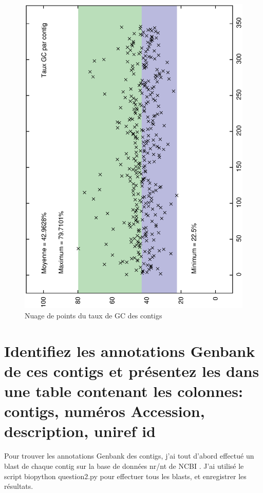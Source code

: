 \documentclass[10.9pt]{article} %
\begin{document}
\begin{figure}[p]
\includegraphics[scale=0.6,angle=270]{question_1/contigs_taux.eps}
\caption{Nuage de points du taux de GC des contigs}
\end{figure}


\newpage
\section{Identifiez les annotations Genbank de ces contigs et présentez les dans une table contenant
les colonnes: contigs, numéros Accession, description, uniref id} %

Pour trouver les annotations Genbank des contigs, j'ai tout d'abord effectué un blast de chaque contig
sur la base de données nr/nt de NCBI \cite{BLAST}. J'ai utilisé le script biopython question2.py pour
effectuer tous les blasts, et enregistrer les résultats.
\end{document}
